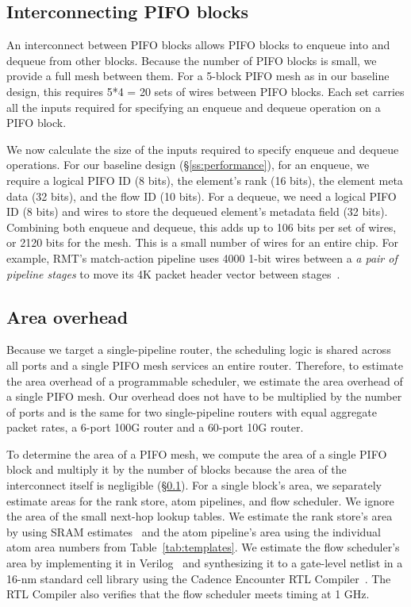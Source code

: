 \subsection{Interconnecting PIFO blocks}
\label{ss:interconnect}

An interconnect between PIFO blocks allows PIFO blocks to enqueue into and
dequeue from other blocks. Because the number of PIFO blocks is small, we
provide a full mesh between them. For a 5-block PIFO mesh as in our baseline
design, this requires 5*4 = 20 sets of wires between PIFO blocks. Each set
carries all the inputs required for specifying an enqueue and dequeue operation
on a PIFO block.

We now calculate the size of the inputs required to specify enqueue and dequeue
operations.  For our baseline design (\S\ref{ss:performance}), for an enqueue,
we require a logical PIFO ID (8 bits), the element's rank (16 bits), the
element meta data (32 bits), and the flow ID (10 bits). For a dequeue, we need
a logical PIFO ID (8 bits) and wires to store the dequeued element's metadata
field (32 bits).  Combining both enqueue and dequeue, this adds up to 106 bits
per set of wires, or 2120 bits for the mesh. This is a small number of wires
for an entire chip.  For example, RMT's match-action pipeline uses 4000 1-bit
wires between a {\em a pair of pipeline stages} to move its 4K packet header
vector between stages~\cite{rmt}. 

\subsection{Area overhead}
\label{ss:feasibility}

Because we target a single-pipeline router, the scheduling logic is shared
across all ports and a single PIFO mesh services an entire router.  Therefore,
to estimate the area overhead of a programmable scheduler, we estimate the area
overhead of a single PIFO mesh. Our overhead does not have to be multiplied by
the number of ports and is the same for two single-pipeline routers with equal
aggregate packet rates, \eg a 6-port 100G router and a 60-port 10G router.

To determine the area of a PIFO mesh, we compute the area of a single PIFO
block and multiply it by the number of blocks because the area of the
interconnect itself is negligible (\S\ref{ss:interconnect}).  For a single
block's area, we separately estimate areas for the rank store, atom pipelines,
and flow scheduler. We ignore the area of the small next-hop lookup tables.  We
estimate the rank store's area by using SRAM estimates~\cite{sram_estimate} and
the atom pipeline's area using the individual atom area numbers from
Table~\ref{tab:templates}. We estimate the flow scheduler's area by
implementing it in Verilog~\cite{system_verilog} and synthesizing it to a
gate-level netlist in a 16-nm standard cell library using the Cadence Encounter
RTL Compiler~\cite{cadence_rc}. The RTL Compiler also verifies that the flow
scheduler meets timing at 1 GHz.

